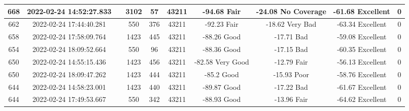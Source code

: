 \begin{longtable*}{|c|c|c|c|c|c|c|c|c|c|}
668&2022-02-24 14:52:27.833&&3102&57&43211& -94.68    Fair        & -24.08    No Coverage & -61.68    Excellent   & 0\\\hline
{}662&2022-02-24 17:44:40.281&&550&376&43211& -92.23    Fair        & -18.62    Very Bad    & -63.34    Excellent   & 0\\\hline
{}658&2022-02-24 17:58:09.764&&1423&445&43211& -88.26    Good        & -17.71    Bad         & -59.08    Excellent   & 0\\\hline
{}654&2022-02-24 18:09:52.664&&550&96&43211& -88.36    Good        & -17.15    Bad         & -60.35    Excellent   & 0\\\hline
{}650&2022-02-24 14:55:15.436&&1423&456&43211& -82.58    Very Good   & -12.79    Fair        & -56.13    Excellent   & 0\\\hline
{}650&2022-02-24 18:09:47.262&&1423&444&43211& -85.2     Good        & -15.93    Poor        & -58.76    Excellent   & 0\\\hline
{}644&2022-02-24 14:58:23.001&&1423&440&43211& -89.87    Good        & -17.22    Bad         & -61.67    Excellent   & 0\\\hline
{}644&2022-02-24 17:49:53.667&&550&342&43211& -88.93    Good        & -13.96    Fair        & -64.62    Excellent   & 0\\\hline

\end{longtable*}
